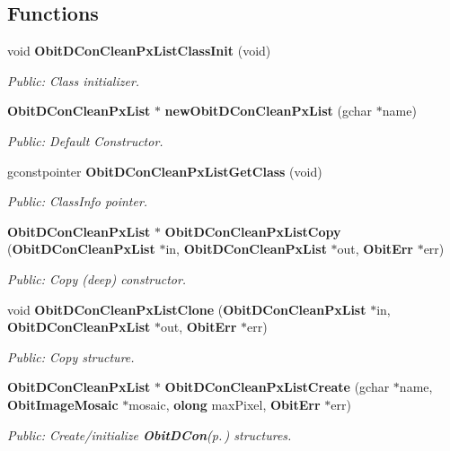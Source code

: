 \subsection*{Functions}
\begin{CompactItemize}
\item 
void {\bf Obit\-DCon\-Clean\-Px\-List\-Class\-Init} (void)
\begin{CompactList}\small\item\em Public: Class initializer. \item\end{CompactList}\item 
{\bf Obit\-DCon\-Clean\-Px\-List} $\ast$ {\bf new\-Obit\-DCon\-Clean\-Px\-List} (gchar $\ast$name)
\begin{CompactList}\small\item\em Public: Default Constructor. \item\end{CompactList}\item 
gconstpointer {\bf Obit\-DCon\-Clean\-Px\-List\-Get\-Class} (void)
\begin{CompactList}\small\item\em Public: Class\-Info pointer. \item\end{CompactList}\item 
{\bf Obit\-DCon\-Clean\-Px\-List} $\ast$ {\bf Obit\-DCon\-Clean\-Px\-List\-Copy} ({\bf Obit\-DCon\-Clean\-Px\-List} $\ast$in, {\bf Obit\-DCon\-Clean\-Px\-List} $\ast$out, {\bf Obit\-Err} $\ast$err)
\begin{CompactList}\small\item\em Public: Copy (deep) constructor. \item\end{CompactList}\item 
void {\bf Obit\-DCon\-Clean\-Px\-List\-Clone} ({\bf Obit\-DCon\-Clean\-Px\-List} $\ast$in, {\bf Obit\-DCon\-Clean\-Px\-List} $\ast$out, {\bf Obit\-Err} $\ast$err)
\begin{CompactList}\small\item\em Public: Copy structure. \item\end{CompactList}\item 
{\bf Obit\-DCon\-Clean\-Px\-List} $\ast$ {\bf Obit\-DCon\-Clean\-Px\-List\-Create} (gchar $\ast$name, {\bf Obit\-Image\-Mosaic} $\ast$mosaic, {\bf olong} max\-Pixel, {\bf Obit\-Err} $\ast$err)
\begin{CompactList}\small\item\em Public: Create/initialize {\bf Obit\-DCon}{\rm (p.\,\pageref{structObitDCon})} structures. \item\end{CompactList}\item 

\end{CompactItemize}
